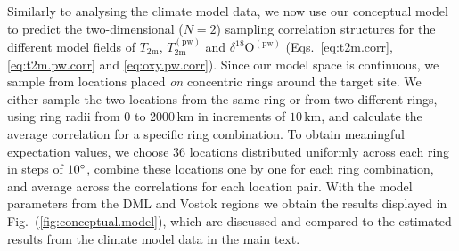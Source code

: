\documentclass[cp, manuscript]{copernicus}
\begin{document}
Similarly to analysing the climate model data, we now use our conceptual model
to predict the two-dimensional ($N=2$) sampling correlation structures for the
different model fields of $T_{\mathrm{2m}}$, $T_{\mathrm{2m}}^{\mathrm{(pw)}}$
and $\delta^{18}\mathrm{O}^{\mathrm{(pw)}}$ (Eqs.~\ref{eq:t2m.corr},
\ref{eq:t2m.pw.corr} and \ref{eq:oxy.pw.corr}). Since our model space is
continuous, we sample from locations placed \emph{on} concentric rings around
the target site. We either sample the two locations from the same ring or from
two different rings, using ring radii from $0$ to $2000$\,km in increments of
$10$\,km, and calculate the average correlation for a specific ring
combination. To obtain meaningful expectation values, we choose $36$ locations
distributed uniformly across each ring in steps of $10^{\circ}$, combine these
locations one by one for each ring combination, and average across the
correlations for each location pair. With the model parameters from the DML and
Vostok regions we obtain the results displayed in
Fig.~(\ref{fig:conceptual.model}), which are discussed and compared to the
estimated results from the climate model data in the main text.

\noappendix





\end{document}
